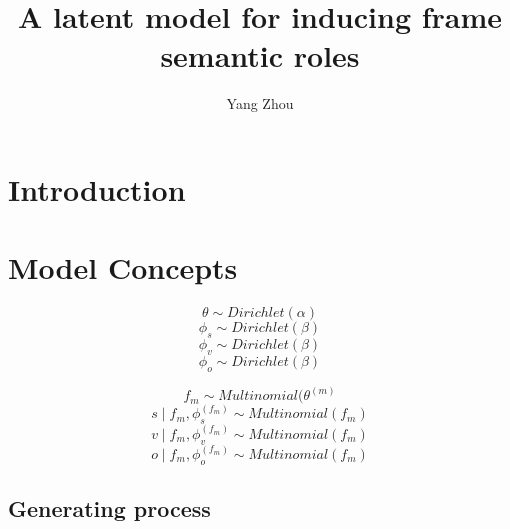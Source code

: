 \documentclass{article}
\title{A latent model for inducing frame semantic roles}
\author{Yang Zhou}
\begin{document}
\maketitle

\section{Introduction}


\section{Model Concepts}






$$\theta	\sim Dirichlet(\alpha)$$
$$\phi_s \sim Dirichlet(\beta)$$ 
$$\phi_v \sim Dirichlet(\beta)$$
$$\phi_o \sim Dirichlet(\beta)$$


$$f_m \sim Multinomial(\theta^{(m)}$$
$$s \mid f_m, \phi_s^{(f_m)} \sim Multinomial(f_m)$$
$$v \mid f_m, \phi_v^{(f_m)} \sim Multinomial(f_m)$$
$$o \mid f_m, \phi_o^{(f_m)} \sim Multinomial(f_m)$$

\subsection{Generating process}
\end{document}
